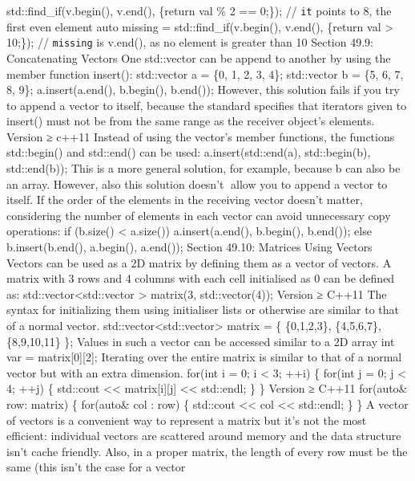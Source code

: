 std::find\_if(v.begin(), v.end(), \href{int\%20val}{}\{return val \% 2
== 0;\}); // \passthrough{\lstinline!it!} points to 8, the first even
element auto missing = std::find\_if(v.begin(), v.end(),
\href{int\%20val}{}\{return val \textgreater{} 10;\}); //
\passthrough{\lstinline!missing!} is v.end(), as no element is greater
than 10 Section 49.9: Concatenating Vectors One std::vector can be
append to another by using the member function insert(): std::vector a =
\{0, 1, 2, 3, 4\}; std::vector b = \{5, 6, 7, 8, 9\}; a.insert(a.end(),
b.begin(), b.end()); However, this solution fails if you try to append a
vector to itself, because the standard speciﬁes that iterators given to
insert() must not be from the same range as the receiver object's
elements. Version ≥ c++11 Instead of using the vector's member
functions, the functions std::begin() and std::end() can be used:
a.insert(std::end(a), std::begin(b), std::end(b)); This is a more
general solution, for example, because b can also be an array. However,
also this solution doesn't allow you to append a vector to itself. If
the order of the elements in the receiving vector doesn't matter,
considering the number of elements in each vector can avoid unnecessary
copy operations: if (b.size() \textless{} a.size()) a.insert(a.end(),
b.begin(), b.end()); else b.insert(b.end(), a.begin(), a.end()); Section
49.10: Matrices Using Vectors Vectors can be used as a 2D matrix by
deﬁning them as a vector of vectors. A matrix with 3 rows and 4 columns
with each cell initialised as 0 can be deﬁned as:
std::vector\textless std::vector \textgreater{} matrix(3,
std::vector(4)); Version ≥ C++11 The syntax for initializing them using
initialiser lists or otherwise are similar to that of a normal vector.
std::vector\textless std::vector\textgreater{} matrix = \{ \{0,1,2,3\},
\{4,5,6,7\}, \{8,9,10,11\} \}; Values in such a vector can be accessed
similar to a 2D array int var = matrix{[}0{]}{[}2{]}; Iterating over the
entire matrix is similar to that of a normal vector but with an extra
dimension. for(int i = 0; i \textless{} 3; ++i) \{ for(int j = 0; j
\textless{} 4; ++j) \{ std::cout \textless\textless{}
matrix{[}i{]}{[}j{]} \textless\textless{} std::endl; \} \} Version ≥
C++11 for(auto\& row: matrix) \{ for(auto\& col : row) \{ std::cout
\textless\textless{} col \textless\textless{} std::endl; \} \} A vector
of vectors is a convenient way to represent a matrix but it's not the
most eﬃcient: individual vectors are scattered around memory and the
data structure isn't cache friendly. Also, in a proper matrix, the
length of every row must be the same (this isn't the case for a vector
